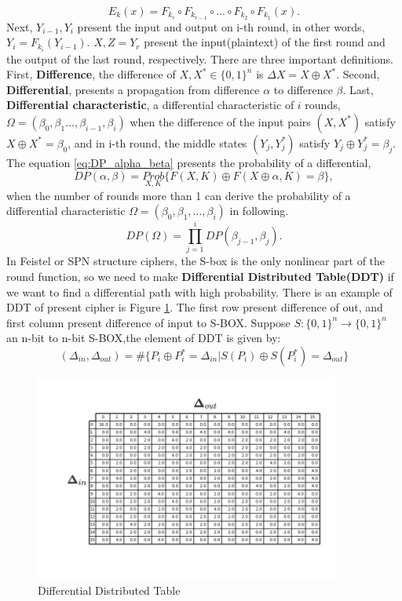 \begin{equation}
    \label{block_cipher_eq}
    E_k(x)=F_{k_r}\circ F_{k_{r-1}}\circ \dots \circ F_{k_2}\circ F_{k_1}(x).
\end{equation}
Next, $Y_{i-1}, Y_i$ present the input and output on i-th round, in other words, $Y_i=F_{k_i}(Y_{i-1})$. $X,Z=Y_r$ present the input(plaintext) of the first round and the output of the last round, respectively. There are three important definitions. First, \textbf{Difference}, the difference of $X, X^*\in\{0,1\}^n$ is $\Delta X = X\oplus X^*$. Second, \textbf{Differential}, presents a propagation from difference $\alpha$ to difference $\beta$.
Last, \textbf{Differential characteristic}, a differential characteristic of $i$ rounds, $\Omega = (\beta_0,\beta_1\dots,\beta_{i-1},\beta_i)$ when the difference of the input pairs $(X,X^*)$ satisfy $X\oplus X^*=\beta_0$, and in i-th round, the middle states $(Y_j ,Y_j^*)$ satisfy $Y_j\oplus Y_j^*=\beta_j$. The equation \ref{eq:DP_alpha_beta} presents the probability of a differential,
\begin{equation}
    \label{eq:DP_alpha_beta}
DP(\alpha,\beta) = \underset{X,K}{Prob}\{F(X,K)\oplus F(X\oplus \alpha, K)=\beta\},
\end{equation} when the number of rounds more than 1 can derive the probability of a differential characteristic $\Omega = (\beta_0, \beta_1,\dots,\beta_i)$ in following.
\begin{equation}
DP(\Omega)=\prod_{j=1}^iDP(\beta_{j-1}, \beta_j).
\end{equation}
In Feistel or SPN structure ciphers, the S-box is the only nonlinear part of the round function, so we need to make \textbf{Differential Distributed Table(DDT)} if we want to find a differential path with high probability. There is an example of DDT of present cipher is Figure \ref{fig:ddt}. The first row present difference of out, and first column present difference of input to S-BOX. Suppose $S:\{0,1\}^n\to\{0,1\}^n$ an n-bit to n-bit S-BOX,the element of DDT is given by:
\begin{equation}
    (\Delta_{in}, \Delta_{out})=\#\{P_i\oplus P_i^*=\Delta_{in}|S(P_i)\oplus S(P_i^*)=\Delta_{out}\}
\end{equation}
\begin{figure}[hbt!]
    \centering
    \includegraphics[width=100mm]{DDT.png}
    \caption[Differential Distributed Table]{Differential Distributed Table}\label{fig:ddt}
\end{figure}
